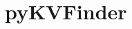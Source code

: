\documentclass[Ingles]{phdthesis}
\def\eg{e.g.\onedot}
\begin{document}




\section{pyKVFinder}

\end{document}
